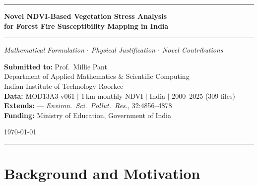 \documentclass[12pt, a4paper]{article}
\begin{document}

\begin{titlepage}
\centering
\vspace*{1.5cm}

{\color{iitblue}\rule{\linewidth}{1.5pt}}
\vspace{0.4cm}

{\LARGE\bfseries\color{iitblue}
Novel NDVI-Based Vegetation Stress Analysis\\[0.5em]
for Forest Fire Susceptibility Mapping in India}

\vspace{0.3cm}
{\color{gold}\rule{\linewidth}{1pt}}
\vspace{0.4cm}

{\large\itshape\color{midblue}
Mathematical Formulation $\cdot$ Physical Justification $\cdot$
Novel Contributions}

\vspace{1.2cm}

\begin{tcolorbox}[enhanced, colback=lightblue, colframe=iitblue,
  width=0.88\textwidth, arc=4pt]
\centering
\textbf{Submitted to:} Prof.\ Millie Pant\\[4pt]
Department of Applied Mathematics \& Scientific Computing\\
Indian Institute of Technology Roorkee\\[8pt]
\textbf{Data:} MOD13A3 v061 $|$ 1\,km monthly NDVI $|$
India $|$ 2000--2025 (309 files)\\[4pt]
\textbf{Extends:} \citealt{biswas2025} ---
\textit{Environ.\ Sci.\ Pollut.\ Res.}, 32:4856--4878\\[4pt]
\textbf{Funding:} Ministry of Education, Government of India
\end{tcolorbox}

\vspace{1cm}
{\large\today}
\vspace*{1cm}

{\color{iitblue}\rule{\linewidth}{1.5pt}}
\end{titlepage}

\tableofcontents
\clearpage

\section{Background and Motivation}
\label{sec:background}
\end{document}
